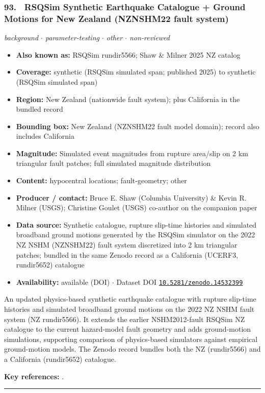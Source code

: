 \documentclass[10pt,a4paper]{article}
\newcommand{\catentryrule}{\par\vspace{3pt}\noindent\textcolor{rulegrey}{\rule{\linewidth}{0.3pt}}\par\vspace{5pt}}
\newcommand{\kv}[2]{\item \textbf{#1:} #2}
\begin{document}
\subsubsection*{\hypertarget{c:93}{93.}~ RSQSim Synthetic Earthquake Catalogue + Ground Motions for New Zealand (NZNSHM22 fault system)}
{\small\itshape background $\cdot$ parameter-testing $\cdot$ other $\cdot$ non-reviewed}\par\vspace{2pt}
\begin{itemize}[leftmargin=1.3em,itemsep=0.6pt,topsep=1pt,parsep=0pt]
\kv{Also known as}{RSQSim rundir5566; Shaw \& Milner 2025 NZ catalog}
\kv{Coverage}{synthetic (RSQSim simulated span; published 2025) to synthetic (RSQSim simulated span)}
\kv{Region}{New Zealand (nationwide fault system); plus California in the bundled record}
\kv{Bounding box}{New Zealand (NZNSHM22 fault model domain); record also includes California}
\kv{Magnitude}{Simulated event magnitudes from rupture area/slip on 2 km triangular fault patches; full simulated magnitude distribution}
\kv{Content}{hypocentral locations; fault-geometry; other}
\kv{Producer / contact}{Bruce E. Shaw (Columbia University) \& Kevin R. Milner (USGS); Christine Goulet (USGS) co-author on the companion paper}
\kv{Data source}{Synthetic catalogue, rupture slip-time histories and simulated broadband ground motions generated by the RSQSim simulator on the 2022 NZ NSHM (NZNSHM22) fault system discretized into 2 km triangular patches; bundled in the same Zenodo record as a California (UCERF3, rundir5652) catalogue}
\kv{Availability}{available (DOI) $\cdot$ Dataset DOI \href{https://doi.org/10.5281/zenodo.14532399}{\nolinkurl{10.5281/zenodo.14532399}}}
\end{itemize}
\par\vspace{2pt}An updated physics-based synthetic earthquake catalogue with rupture slip-time histories and simulated broadband ground motions on the 2022 NZ NSHM fault system (NZ rundir5566). It extends the earlier NSHM2012-fault RSQSim NZ catalogue to the current hazard-model fault geometry and adds ground-motion simulations, supporting comparison of physics-based simulators against empirical ground-motion models. The Zenodo record bundles both the NZ (rundir5566) and a California (rundir5652) catalogue.
\par\vspace{2pt}\textbf{Key references:} \cite{Shaw2025,Shaw2025a}.
\catentryrule
\end{document}

